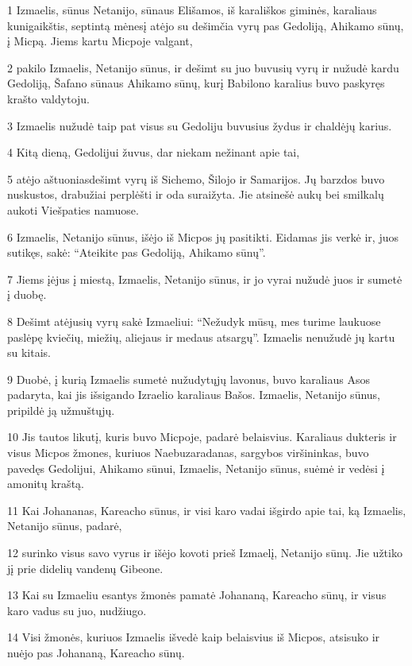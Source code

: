 \par 1 Izmaelis, sūnus Netanijo, sūnaus Elišamos, iš karališkos giminės, karaliaus kunigaikštis, septintą mėnesį atėjo su dešimčia vyrų pas Gedoliją, Ahikamo sūnų, į Micpą. Jiems kartu Micpoje valgant, 
\par 2 pakilo Izmaelis, Netanijo sūnus, ir dešimt su juo buvusių vyrų ir nužudė kardu Gedoliją, Šafano sūnaus Ahikamo sūnų, kurį Babilono karalius buvo paskyręs krašto valdytoju. 
\par 3 Izmaelis nužudė taip pat visus su Gedoliju buvusius žydus ir chaldėjų karius. 
\par 4 Kitą dieną, Gedolijui žuvus, dar niekam nežinant apie tai, 
\par 5 atėjo aštuoniasdešimt vyrų iš Sichemo, Šilojo ir Samarijos. Jų barzdos buvo nuskustos, drabužiai perplėšti ir oda suraižyta. Jie atsinešė aukų bei smilkalų aukoti Viešpaties namuose. 
\par 6 Izmaelis, Netanijo sūnus, išėjo iš Micpos jų pasitikti. Eidamas jis verkė ir, juos sutikęs, sakė: “Ateikite pas Gedoliją, Ahikamo sūnų”. 
\par 7 Jiems įėjus į miestą, Izmaelis, Netanijo sūnus, ir jo vyrai nužudė juos ir sumetė į duobę. 
\par 8 Dešimt atėjusių vyrų sakė Izmaeliui: “Nežudyk mūsų, mes turime laukuose paslėpę kviečių, miežių, aliejaus ir medaus atsargų”. Izmaelis nenužudė jų kartu su kitais. 
\par 9 Duobė, į kurią Izmaelis sumetė nužudytųjų lavonus, buvo karaliaus Asos padaryta, kai jis išsigando Izraelio karaliaus Bašos. Izmaelis, Netanijo sūnus, pripildė ją užmuštųjų. 
\par 10 Jis tautos likutį, kuris buvo Micpoje, padarė belaisvius. Karaliaus dukteris ir visus Micpos žmones, kuriuos Naebuzaradanas, sargybos viršininkas, buvo pavedęs Gedolijui, Ahikamo sūnui, Izmaelis, Netanijo sūnus, suėmė ir vedėsi į amonitų kraštą. 
\par 11 Kai Johananas, Kareacho sūnus, ir visi karo vadai išgirdo apie tai, ką Izmaelis, Netanijo sūnus, padarė, 
\par 12 surinko visus savo vyrus ir išėjo kovoti prieš Izmaelį, Netanijo sūnų. Jie užtiko jį prie didelių vandenų Gibeone. 
\par 13 Kai su Izmaeliu esantys žmonės pamatė Johananą, Kareacho sūnų, ir visus karo vadus su juo, nudžiugo. 
\par 14 Visi žmonės, kuriuos Izmaelis išvedė kaip belaisvius iš Micpos, atsisuko ir nuėjo pas Johananą, Kareacho sūnų. 
